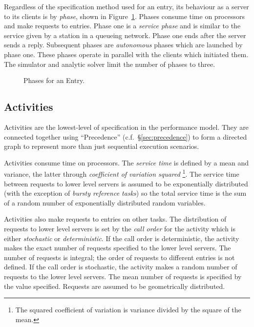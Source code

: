 Regardless of the specification method used for an entry, its
behaviour as a server to its clients is by \emph{phase},
shown in Figure~\ref{fig:phase}.  Phases consume time on processors
and make requests to entries.  Phase one is a \emph{service phase} and
is similar to the service given by a station in a queueing network.
Phase one ends after the server sends a reply.
Subsequent phases are \emph{autonomous} phases
which are launched by phase one.  These phases operate in parallel
with the clients which initiated them.  The simulator and analytic
solver limit the number of phases to three.

\begin{figure}[htbp]
  \centering
  \caption{Phases for an Entry.\protect{}}
  \label{fig:phase}
\end{figure}

\subsection{Activities}
\label{sec:activities}

Activities are the lowest-level of
specification in the performance model.  They are connected together
using ``Precedence'' (c.f.~\S\ref{sec:precedence})
to form a directed graph to represent more than
just sequential execution scenarios.

Activities consume time on processors.  The \emph{service time} is defined by a mean and
variance, the latter through \emph{coefficient of variation squared}
\footnote{The squared coefficient of variation is variance divided by the square of the mean.}. The service
time between requests to lower level servers is assumed to be exponentially distributed (with the exception
of \emph{bursty reference tasks}) so the total service time is the sum of a
random number of exponentially distributed random variables.

Activities also make requests to entries on other tasks.  The distribution of requests to lower level
servers is set by the \emph{call order} for the activity which is either
\emph{stochastic} or \emph{deterministic}.  If the call order is
deterministic, the activity makes the exact number of requests specified to the lower level servers.  The
number of requests is integral; the order of requests to different entries is not defined.  If the call
order is stochastic, the activity makes a random number of requests to the lower level servers.  The mean
number of requests is specified by the value specified.  Requests are assumed to be geometrically
distributed.

